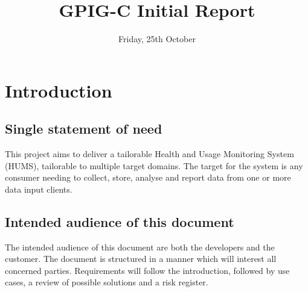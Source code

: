 \documentclass[10pt,a4paper]{article}
\begin{document}
\title{\vspace{-1cm}GPIG-C Initial Report}
\author{}
\date{\vspace{-1cm} Friday, 25th October}
\maketitle
\thispagestyle{fancy} %

\section{Introduction}
\subsection{Single statement of need}
This project aims to deliver a tailorable Health and Usage Monitoring System (HUMS), tailorable to multiple target domains. The target for the system is any consumer needing to collect, store, analyse and report data from one or more data input clients.
\subsection{Intended audience of this document}
The intended audience of this document are both the developers and the customer. The document is structured in a manner which will interest all concerned parties. Requirements will follow the introduction, followed by use cases, a review of possible solutions and a risk register.
\end{document}
